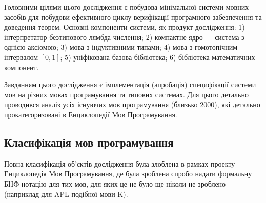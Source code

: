 Головними цілями цього дослідження є побудова мінімальної системи
мовних засобів для побудови ефективного циклу верифікації програмного
забезпечення та доведення теорем. Основні компоненти системи, як продукт дослідження:
1) інтерпретатор безтипового лямбда числення;
2) компактне ядро --- система з однією аксіомою;
3) мова з індуктивними типами;
4) мова з гомотопічним інтервалом $[0,1]$;
5) уніфікована базова бібліотека;
6) бібліотека математичних компонент.

Завданням цього дослідження є імплементація (апробація)
специфікації системи мов на різних мовах програмування та типових системах.
Для цього детально проводився аналіз усіх існуючих мов
програмування (близько 2000), які детально прокатегоризовані
в Енциклопедії Мов Програмування.

\subsection{Класифікація мов програмування}
Повна класифікація об'єктів дослідження була злоблена в рамках проекту
Енциклопедія Мов Програмування, де була зроблена спробо надати
формальну БНФ-нотацію для тих мов, для яких це не було ще ніколи
не зроблено (наприклад для APL-подібної мови K).


